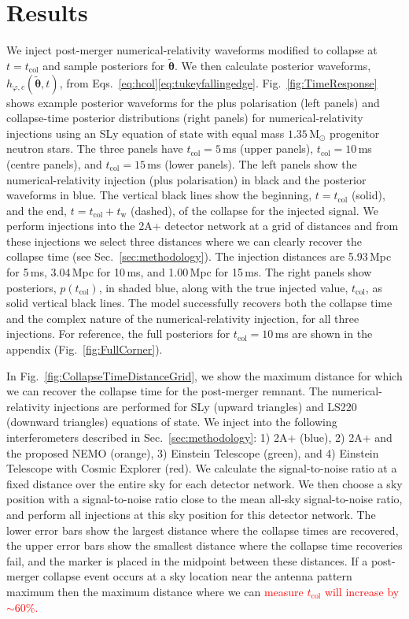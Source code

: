 \documentclass[
reprint,
prd,
twocolumn,
nofootinbib,
 amsmath,
showpacs ,amssymb, aps,%
superscriptaddress
]{revtex4-1}
\newcommand{\red}[1]{\textcolor{red}{#1}}
\newcommand{\tc}{t_{\mathrm{col}}}
\newcommand{\tw}{t_{\mathrm{w}}}
\begin{document}
\section{Results}\label{sec:results}
    We inject post-merger numerical-relativity waveforms modified to collapse at $t=\tc$ and sample posteriors for $\boldsymbol{\tilde{\theta}}$.
    We then calculate posterior waveforms, $h_{\varphi,c}(\boldsymbol{\tilde{\theta}},t)$, from Eqs.~\ref{eq:hcol}\Hyphdash*\ref{eq:tukeyfallingedge}.
    Fig.~\ref{fig:TimeResponse} shows example posterior waveforms for the plus polarisation (left panels) and collapse-time posterior distributions (right panels) for numerical-relativity injections using an SLy equation of state with equal mass $1.35\,\mathrm{M}_\odot$ progenitor neutron stars.
    The three panels have $\tc=5$\,ms (upper panels), $\tc=10$\,ms (centre panels), and $\tc=15$\,ms (lower panels).
    The left panels show the numerical-relativity injection (plus polarisation) in black and the posterior waveforms in blue.
    The vertical black lines show the beginning, $t=\tc$ (solid), and the end, $t=\tc+\tw$ (dashed), of the collapse for the injected signal.
    We perform injections into the 2A+ detector network at a grid of distances  and from these injections we select three distances where we can clearly recover the collapse time (see Sec.~\ref{sec:methodology}).
    The injection distances are 5.93\,Mpc for 5\,ms, 3.04\,Mpc for 10\,ms, and 1.00\,Mpc for 15\,ms.
    The right panels show posteriors, $p(\tc)$, in shaded blue, along with the true injected value, $\tc$, as solid vertical black lines.
    The model successfully recovers both the collapse time and the complex nature of the numerical-relativity injection, for all three injections.
    For reference, the full posteriors for $\tc=10\,$ms are shown in the appendix (Fig.~\ref{fig:FullCorner}).\par

\par
    In Fig.~\ref{fig:CollapseTimeDistanceGrid}, we show the maximum distance for which we can recover the collapse time for the post-merger remnant.
    The numerical-relativity injections are performed for SLy (upward triangles) and LS220 (downward triangles) equations of state.
    We inject into the following interferometers described in Sec.~\ref{sec:methodology}: 1) 2A+ (blue), 2) 2A+ and the proposed NEMO (orange), 3) Einstein Telescope (green), and 4) Einstein Telescope with Cosmic Explorer (red).
    We calculate the signal-to-noise ratio at a fixed distance over the entire sky for each detector network.
    We then choose a sky position with a signal-to-noise ratio close to the mean all-sky signal-to-noise ratio, and perform all injections at this sky position for this detector network.
    The lower error bars show the largest distance where the collapse times are recovered, the upper error bars show the smallest distance where the collapse time recoveries fail, and the marker is placed in the midpoint between these distances.
    If a post-merger collapse event occurs at a sky location near the antenna pattern maximum then the maximum distance where we can \red{measure $\tc$ will increase by $\sim\!60\%$.}
    \par
    
\end{document}
